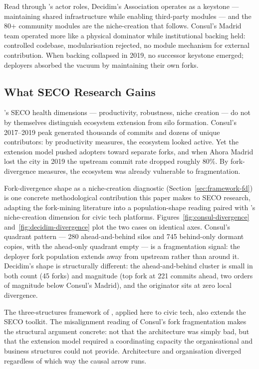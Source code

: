 \documentclass[11pt,a4paper]{article}
\begin{document}
Read through \citet{iansiti2004strategy}'s actor roles, Decidim's Association operates as a keystone --- maintaining shared infrastructure while enabling third-party modules --- and the 80+ community modules are the niche-creation that follows. Consul's Madrid team operated more like a physical dominator while institutional backing held: controlled codebase, modularisation rejected, no module mechanism for external contribution. When backing collapsed in 2019, no successor keystone emerged; deployers absorbed the vacuum by maintaining their own forks.

\subsection{What SECO Research Gains}\label{sec:disc-seco}

\citet{jansen2014measuring}'s SECO health dimensions --- productivity, robustness, niche creation --- do not by themselves distinguish ecosystem extension from silo formation. Consul's 2017--2019 peak generated thousands of commits and dozens of unique contributors: by productivity measures, the ecosystem looked active. Yet the extension model pushed adopters toward separate forks, and when Ahora Madrid lost the city in 2019 the upstream commit rate dropped roughly $80\%$. By fork-divergence measures, the ecosystem was already vulnerable to fragmentation.

Fork-divergence shape as a niche-creation diagnostic (Section~\ref{sec:framework-fd}) is one concrete methodological contribution this paper makes to SECO research, adapting the fork-mining literature \citep{zhou2020forks, wang2023forkentropy, businge2022reuse} into a population-shape reading paired with \citet{jansen2014measuring}'s niche-creation dimension for civic tech platforms. Figures~\ref{fig:consul-divergence} and~\ref{fig:decidim-divergence} plot the two cases on identical axes. Consul's quadrant pattern --- 280 ahead-and-behind silos and 745 behind-only dormant copies, with the ahead-only quadrant empty --- is a fragmentation signal: the deployer fork population extends away from upstream rather than around it. Decidim's shape is structurally different: the ahead-and-behind cluster is small in both count (45 forks) and magnitude (top fork at 221 commits ahead, two orders of magnitude below Consul's Madrid), and the originator sits at zero local divergence.

The three-structures framework of \citet{christensen2014analysis}, applied here to civic tech, also extends the SECO toolkit. The misalignment reading of Consul's fork fragmentation makes the structural argument concrete: not that the architecture was simply bad, but that the extension model required a coordinating capacity the organisational and business structures could not provide. Architecture and organisation diverged regardless of which way the causal arrow runs.
\end{document}
